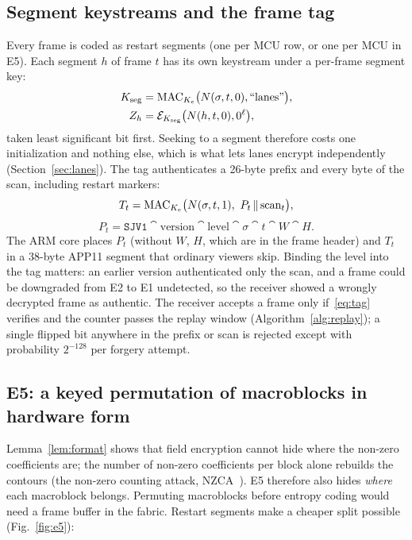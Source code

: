 \subsection{Segment keystreams and the frame tag}\label{sec:tag}
Every frame is coded as restart segments (one per MCU row, or one per MCU in E5). Each segment $h$ of frame $t$ has its own keystream under a per-frame segment key:
\begin{align}
K_{\mathrm{seg}} &= \mathrm{MAC}_{K_e}\bigl(N(\sigma, t, 0), \text{``lanes''}\bigr), \label{eq:kseg}\\
Z_h &= \mathcal{E}_{K_{\mathrm{seg}}}\bigl(N(h, t, 0), 0^{\ell}\bigr), \label{eq:zs}
\end{align}
taken least significant bit first. Seeking to a segment therefore costs one initialization and nothing else, which is what lets lanes encrypt independently (Section~\ref{sec:lanes}). The tag authenticates a 26-byte prefix and every byte of the scan, including restart markers:
\begin{equation}
T_t = \mathrm{MAC}_{K_e}\bigl(N(\sigma, t, 1),\ P_t \,\|\, \text{scan}_t\bigr),
\label{eq:tag}
\end{equation}
\begin{equation*}
P_t = \texttt{SJV1} \cat \text{version} \cat \text{level} \cat \sigma \cat t \cat W \cat H.
\end{equation*}
The ARM core places $P_t$ (without $W$, $H$, which are in the frame header) and $T_t$ in a 38-byte APP11 segment that ordinary viewers skip. Binding the level into the tag matters: an earlier version authenticated only the scan, and a frame could be downgraded from E2 to E1 undetected, so the receiver showed a wrongly decrypted frame as authentic. The receiver accepts a frame only if~\eqref{eq:tag} verifies and the counter passes the replay window (Algorithm~\ref{alg:replay}); a single flipped bit anywhere in the prefix or scan is rejected except with probability $2^{-128}$ per forgery attempt.

\subsection{E5: a keyed permutation of macroblocks in hardware form}\label{sec:e5}
Lemma~\ref{lem:format} shows that field encryption cannot hide where the non-zero coefficients are; the number of non-zero coefficients per block alone rebuilds the contours (the non-zero counting attack, NZCA~\cite{hirose2024}). E5 therefore also hides \emph{where} each macroblock belongs. Permuting macroblocks before entropy coding would need a frame buffer in the fabric. Restart segments make a cheaper split possible (Fig.~\ref{fig:e5}):

